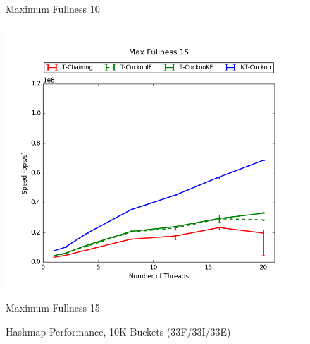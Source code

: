 \begin{figure}[H]
\begin{minipage}{0.45\textwidth}
        \caption*{Maximum Fullness 10}
    \end{minipage}
	\begin{minipage}{0.45\textwidth}\includegraphics[width=\textwidth]{maps/15HM10K:F34,I33,E33.png} 
        \caption*{Maximum Fullness 15}
    \end{minipage}
	\caption{Hashmap Performance, 10K Buckets (33F/33I/33E)}
\end{figure}
